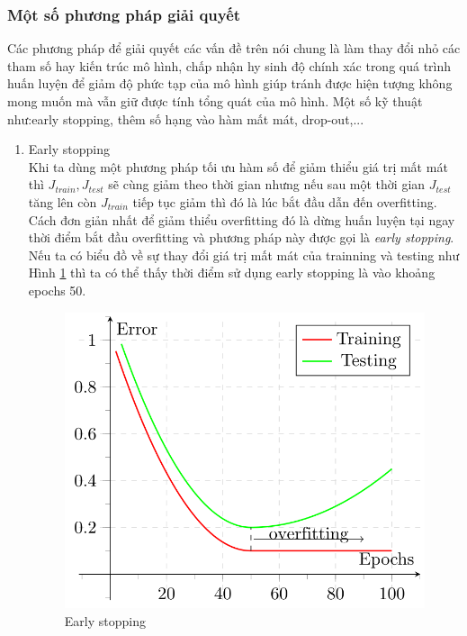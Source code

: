 \subsubsection{Một số phương pháp giải quyết}
Các phương pháp để giải quyết các vấn đề trên nói chung là làm thay đổi nhỏ các tham số hay kiến trúc mô hình, chấp nhận hy sinh độ chính xác trong quá trình huấn luyện để giảm độ phức tạp của mô hình giúp tránh được hiện tượng không mong muốn mà vẫn giữ được tính tổng quát của mô hình. Một số kỹ thuật như:early stopping, thêm số hạng vào hàm mất mát, drop-out,...
\begin{enumerate}
\item Early stopping\\
  Khi ta dùng một phương pháp tối ưu hàm số để giảm thiểu giá trị mất mát thì \textit{$J_{train}, J_{test}$} sẽ cùng giảm theo thời gian nhưng nếu sau một thời gian \textit{$J_{test}$} tăng lên còn \textit{$J_{train}$} tiếp tục giảm thì đó là lúc bắt đầu dẫn đến overfitting. Cách đơn giản nhất để giảm thiểu overfitting đó là dừng huấn luyện tại ngay thời điểm bắt đầu overfitting và phương pháp này được gọi là \textit{early stopping}. Nếu ta có biểu đồ về sự thay đổi giá trị mất mát của trainning và testing như Hình \ref{fig:overfittingError} thì ta có thể thấy thời điểm sử dụng early stopping là vào khoảng epochs 50.

\begin{center}
 	\begin{figure}[H]
    \begin{center}
    \includegraphics[scale=0.5]{chap3/image/overfittingError.png}
    \end{center}
    \caption{Early stopping}
    \label{fig:overfittingError}
    \end{figure}
\end{center}


\end{enumerate}
